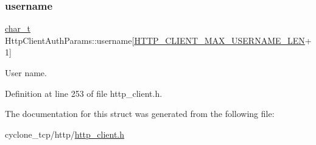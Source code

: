 \mbox{\label{structHttpClientAuthParams_a5cadfff947b3c71dfad308cfd94fd5cd}} 
\subsubsection{\texorpdfstring{username}{username}}
{\footnotesize\ttfamily \hyperlink{compiler__port_8h_a40bb5262bf908c328fbcfbe5d29d0201}{char\+\_\+t} Http\+Client\+Auth\+Params\+::username\mbox{[}\hyperlink{http__client_8h_a222fb28335a6fdc8279c0db1d2d71ef8}{H\+T\+T\+P\+\_\+\+C\+L\+I\+E\+N\+T\+\_\+\+M\+A\+X\+\_\+\+U\+S\+E\+R\+N\+A\+M\+E\+\_\+\+L\+EN}+1\mbox{]}}



User name. 



Definition at line 253 of file http\+\_\+client.\+h.



The documentation for this struct was generated from the following file\+:\begin{DoxyCompactItemize}
\item 
cyclone\+\_\+tcp/http/\hyperlink{http__client_8h}{http\+\_\+client.\+h}\end{DoxyCompactItemize}
